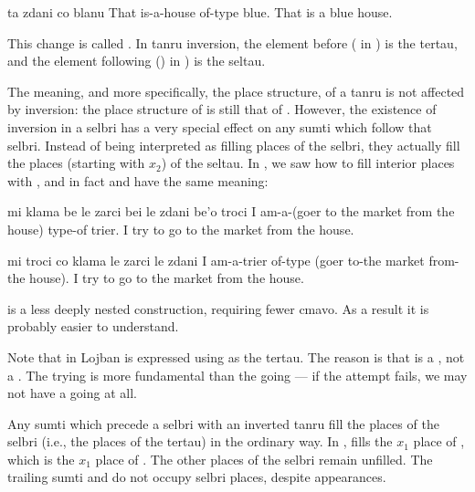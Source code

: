 \begin{example}
ta zdani co blanu\n
That is-a-house of-type blue.\n
That is a blue house.
\end{example}

This change is called . In tanru inversion,
    the element before  ( in ) is the tertau, and the element following 
    () in ) is the seltau. 

The meaning, and more specifically, the place structure, of
    a tanru is not affected by inversion: the place structure of
     is still that of . However, the
    existence of inversion in a selbri has a very special effect on
    any sumti which follow that selbri. Instead of being
    interpreted as filling places of the selbri, they actually fill
    the places (starting with $x_2$) of the seltau. In , we saw how to fill interior places
    with , and in fact  and  have the same meaning:
\begin{example}
mi klama be le zarci bei le zdani be'o\n
\T	troci\n
I am-a-(goer to the market from the house)\n
\T	type-of trier.\n
I try to go to the market from the house.
\end{example}

\begin{example}
mi troci co klama le zarci le zdani\n
I am-a-trier\n
\T	of-type (goer to-the market from-the house).\n
I try to go to the market from the house.
\end{example}

 is a less deeply nested
    construction, requiring fewer cmavo. As a result it is probably
    easier to understand. 

Note that in Lojban  is expressed using
     as the tertau. The reason is that  is
    a , not a . The
    trying is more fundamental than the going --- if the attempt
    fails, we may not have a going at all.

Any sumti which precede a selbri with an inverted tanru fill
    the places of the selbri (i.e., the places of the tertau) in
    the ordinary way. In , 
    fills the $x_1$ place of , which is the $x_1$ place
    of . The other places of the selbri remain unfilled.
    The trailing sumti  and  do not occupy
    selbri places, despite appearances.

